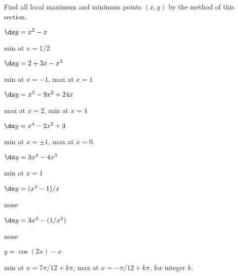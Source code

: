 \begin{enumialphparenastyle}

Find all local maximum and minimum points $(x,y)$ by the method of this section.

\begin{ex}
	$\ds y=x^2-x$ 
	\begin{sol}
		min at $x=1/2$
	\end{sol}
\end{ex}

\begin{ex}
	$\ds y=2+3x-x^3$ 
	\begin{sol}
		min at $x=-1$, max at $x=1$
	\end{sol}
\end{ex}

\begin{ex}
	$\ds y=x^3-9x^2+24x$
	\begin{sol}
		max at $x=2$, min at $x=4$
	\end{sol}
\end{ex}

\begin{ex}
	$\ds y=x^4-2x^2+3$ 
	\begin{sol}
		min at $x=\pm 1$, max at $x=0$.
	\end{sol}
\end{ex}

\begin{ex}
	$\ds y=3x^4-4x^3$
	\begin{sol}
		min at $x=1$
	\end{sol}
\end{ex}

\begin{ex}
	$\ds y=(x^2-1)/x$
	\begin{sol}
		none
	\end{sol}
\end{ex}

\begin{ex}
	$\ds y=3x^2-(1/x^2)$ 
	\begin{sol}
		none
	\end{sol}
\end{ex}

\begin{ex}
	$y=\cos(2x)-x$ 
	\begin{sol}
		min at $x=7\pi/12+k\pi$, max at $x=-\pi/12+k\pi$, for integer $k$.
	\end{sol}
\end{ex}


\end{enumialphparenastyle}
